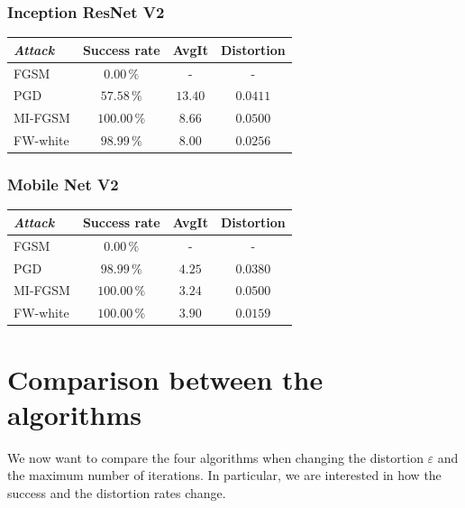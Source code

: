 \documentclass[10pt,twocolumn,letterpaper, english]{article}
\theoremstyle{definition}
\theoremstyle{plain}
\theoremstyle{plain}
\theoremstyle{plain}
\theoremstyle{plain}
\theoremstyle{remark}
\theoremstyle{remark}
\theoremstyle{definition}
\theoremstyle{definition}
\theoremstyle{definition}
\theoremstyle{definition}
\renewcommand{\epsilon}{\varepsilon}
\begin{document}
\subsubsection{Inception ResNet V2}

\begin{center}
    

\begin{tabular}{ |l|c|c|c| }
 \hline
  \textit{Attack} & Success rate & AvgIt & Distortion \\
 \hline
 
 FGSM   & $0.00\,\%$   &  - & -\\
 PGD&   $57.58\,\%$  & $13.40$  & $0.0411$ \\
 MI-FGSM & $100.00\,\%$ & $8.66$ & $0.0500$\\
 FW-white & $98.99\,\%$ & $8.00$ & $0.0256$\\
\hline
\end{tabular}
\end{center}

\subsubsection{Mobile Net V2}

\begin{center}
    

\begin{tabular}{ |l|c|c|c| }
 \hline
  \textit{Attack} & Success rate & AvgIt & Distortion \\
 \hline
 
 FGSM   & $0.00\,\%$   &  - & -\\
 PGD&   $98.99\,\%$  & $4.25$  & $0.0380$ \\
 MI-FGSM & $100.00\,\%$ & $3.24$ & $0.0500$\\
 FW-white & $100.00\,\%$ & $3.90$ & $0.0159$\\
\hline
\end{tabular}
\end{center}


\section{Comparison between the algorithms}


We now want to compare the four algorithms when changing the distortion $\epsilon$ and the maximum number of iterations. 
In particular, we are interested in how the success and the distortion rates change. 
\end{document}
